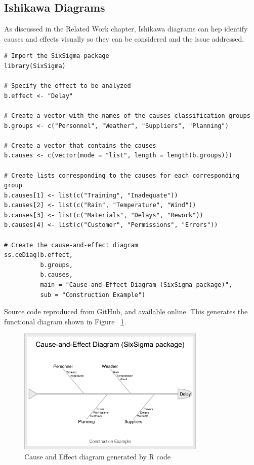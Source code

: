 \subsection{Ishikawa Diagrams}
As discussed in the Related Work chapter, Ishikawa diagrams can hep identify causes and effects visually so they can be considered and the issue addressed.

\begin{lstlisting}
# Import the SixSigma package
library(SixSigma)

# Specify the effect to be analyzed
b.effect <- "Delay"

# Create a vector with the names of the causes classification groups
b.groups <- c("Personnel", "Weather", "Suppliers", "Planning")

# Create a vector that contains the causes
b.causes <- c(vector(mode = "list", length = length(b.groups)))

# Create lists corresponding to the causes for each corresponding group
b.causes[1] <- list(c("Training", "Inadequate"))
b.causes[2] <- list(c("Rain", "Temperature", "Wind"))
b.causes[3] <- list(c("Materials", "Delays", "Rework"))
b.causes[4] <- list(c("Customer", "Permissions", "Errors"))

# Create the cause-and-effect diagram
ss.ceDiag(b.effect,
          b.groups,
          b.causes,
          main = "Cause-and-Effect Diagram (SixSigma package)",
          sub = "Construction Example")
\end{lstlisting}
Source code reproduced from GitHub, and \href{https://gist.github.com/rsalaza4/eff4a0a7e8e4894e4b82152fcf66e847/raw/cfbfe93c784989ee8fd6b686dd26fb88f4cec26d/Cause-and-effect\%20diagram.R}{available online}. This generates the functional diagram shown in Figure ~\ref{fig:ishikawa-example-in-R}.

\begin{figure}[htbp!]
    \centering
    \includegraphics[width=0.8\textwidth]{images/cause-effect-diagram.png}
    \caption{Cause and Effect diagram generated by R code}
    \label{fig:ishikawa-example-in-R}
\end{figure}

